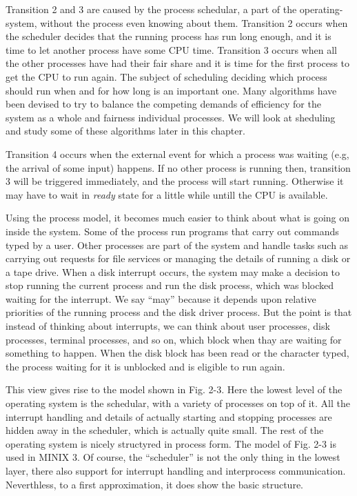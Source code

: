 \documentclass{book}
\newcommand {\sys} [1] {\textsl{#1}}
\begin{document}
Transition 2 and 3 are caused by the process schedular, a part of the operating-system,
without the process even knowing about them.
Transition 2 occurs when the scheduler decides that the running process has run long enough,
and it is time to let another process have some CPU time.
Transition 3 occurs when all the other processes have had their fair share 
and it is time for the first process to get the CPU to run again.
The subject of scheduling deciding which process should run when and for how long is an important one.
Many algorithms have been devised to try to 
balance the competing demands of efficiency for the system as a whole and fairness individual processes.
We will look at sheduling and study some of these algorithms later in this chapter.

Transition 4 occurs when the external event for which a process was waiting (e.g, the arrival of some input) happens.
If no other process is running then, transition 3 will be triggered immediately,
and the process will start running.
Otherwise it may have to wait in \sys{ready} state for a little while untill the CPU is available.

Using the process model, it becomes much easier to think about what is going on inside the system.
Some of the process run programs that carry out commands typed by a user.
Other processes are part of the system and handle tasks such as carrying out requests for file services 
or managing the details of running a disk or a tape drive.
When a disk interrupt occurs, the system may make a decision to stop running the current process and run the disk process,
which was blocked waiting for the interrupt.
We say ``may'' because it depends upon relative priorities of the running process and the disk driver process.
But the point is that instead of thinking about interrupts, we can think about user processes, disk processes, terminal processes, and so on,
which block when thay are waiting for something to happen.
When the disk block has been read or the character typed, the process waiting for it is unblocked
and is eligible to run again.

This view gives rise to the model shown in Fig. 2-3.
Here the lowest level of the operating system is the schedular, with a variety of processes on top of it.
All the interrupt handling and details of actually starting and stopping processes are hidden away in the scheduler,
which is actually quite small.
The rest of the operating system is nicely structyred in process form.
The model of Fig. 2-3 is used in MINIX 3.
Of course, the ``scheduler'' is not the only thing in the lowest layer, 
there also support for interrupt handling and interprocess communication.
Neverthless, to a first approximation, it does show the basic structure.
\end{document}

